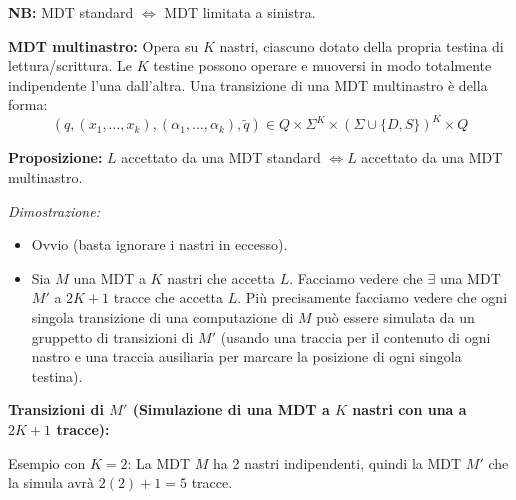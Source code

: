 \textbf{NB:} MDT standard $\iff$ MDT limitata a sinistra.


\vspace{0.8cm}
\textbf{MDT multinastro:} Opera su $K$ nastri, ciascuno dotato della propria testina di lettura/scrittura. Le $K$ testine possono operare e muoversi in modo totalmente indipendente l'una dall'altra.
Una transizione di una MDT multinastro è della forma:
$$ (q, (x_1, \dots, x_k), (\alpha_1, \dots, \alpha_k), \tilde{q}) \in Q \times \Sigma^K \times (\Sigma \cup \{D, S\})^K \times Q $$

\textbf{Proposizione:} $L$ accettato da una MDT standard $\iff L$ accettato da una MDT multinastro.

\textit{Dimostrazione:}
\begin{itemize}
    \item[$\implies$)] Ovvio (basta ignorare i nastri in eccesso).
    \item[$\impliedby$)] Sia $M$ una MDT a $K$ nastri che accetta $L$. Facciamo vedere che $\exists$ una MDT $M'$ a $2K+1$ tracce che accetta $L$. Più precisamente facciamo vedere che ogni singola transizione di una computazione di $M$ può essere simulata da un gruppetto di transizioni di $M'$ (usando una traccia per il contenuto di ogni nastro e una traccia ausiliaria per marcare la posizione di ogni singola testina).
\end{itemize}

\vspace{0.6cm}
\textbf{Transizioni di $M'$ (Simulazione di una MDT a $K$ nastri con una a $2K+1$ tracce):}

Esempio con $K=2$: La MDT $M$ ha 2 nastri indipendenti, quindi la MDT $M'$ che la simula avrà $2(2)+1 = 5$ tracce.

